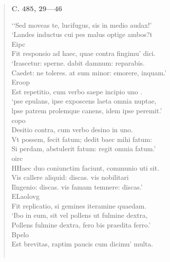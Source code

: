 \documentclass[11pt, a4paper]{report}
\begin{document}
\begin{verse}
    \begin{center} \textbf{C. 485, 29—46} \end{center}‘‘Sed moveas te, lucifugus, sis in medio audax!’ \\ ‘Landes inductus cui pes malus optige ambos?t \\ Eipc \\ Fit responsio ad haec, quae contra fingimu’ dici. \\ ‘Irascetur: sperne. dabit damnum: reparabis. \\ Caedet: ne toleres. at sum minor: emorere, inquam.’ \\ Eroop \\ Est repetitio, cum verbo saepe incipio  \lbrack uno \rbrack . \\ ‘pse epulans, ipse exposcens laeta omnia nuptae, \\ lpse patrem prolemque canens, idem ipse peremit.’ \\ copo \\ Desitio contra, cum verbo desino in uno. \\ Vt possem, fecit fatum; dedit baec mihi fatum: \\ Si perdam, abstulerit fatum: regit omnia fatum.’ \\ oirc \\ HHaec duo coniunctim faciunt, communio uti sit. \\ Vis callere aliquid: discas. vis nobilitari \\ Ilngenio: discas. vis famam temnere: discas.’ \\ ELaolovg \\ Fit replicatio, si gemines iteramine quaedam. \\ ‘Ibo in eum, sit vel pollens ut fulmine dextra, \\ Pollens fulmine dextra, fero bis praedita ferro.’ \\ Bpelo \\ Est brevitas, raptim paucis cum dicimu’ multa. \\ 
        ﻿\pagebreak 

\end{verse}
\end{document}
